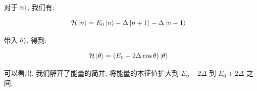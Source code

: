 对于$\ket{n}$, 我们有:

\begin{equation}
  \begin{aligned}
    \mathcal{H} \ket{n} = E_0 \ket{n} - \Delta \ket{n+1} - \Delta \ket{n-1}
  \end{aligned}
\end{equation}

带入$\ket{\theta}$, 得到:

\begin{equation}
  \begin{aligned}
    \mathcal{H} \ket{\theta} = (E_0 - 2 \Delta \cos \theta) \ket{\theta}
  \end{aligned}
\end{equation}

可以看出, 我们解开了能量的简并, 将能量的本征值扩大到 $E_0 - 2 \Delta$ 到
$E_0 + 2 \Delta$ 之间.
